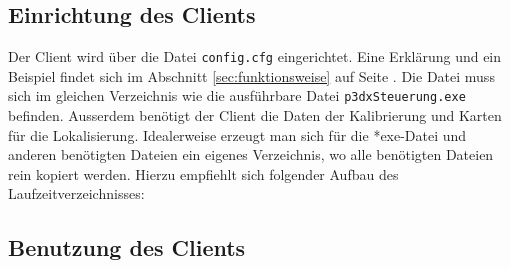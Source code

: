 \subsection{Einrichtung des Clients}%
\label{sec:einrichtung-client}
Der Client wird über die Datei \verb|config.cfg| eingerichtet. Eine
Erklärung und ein Beispiel findet sich im Abschnitt
\ref{sec:funktionsweise} auf Seite \pageref{aufbau_config}. Die Datei
muss sich im gleichen Verzeichnis wie die ausführbare Datei
\verb|p3dxSteuerung.exe| befinden. Ausserdem benötigt der Client die
Daten der Kalibrierung und Karten für die Lokalisierung. Idealerweise
erzeugt man sich für die *exe-Datei und anderen benötigten Dateien ein
eigenes Verzeichnis, wo alle benötigten Dateien rein kopiert werden.  Hierzu
empfiehlt sich folgender Aufbau des Laufzeitverzeichnisses: 

\subsection{Benutzung des Clients}
\label{sec:benutz-des-clients}
